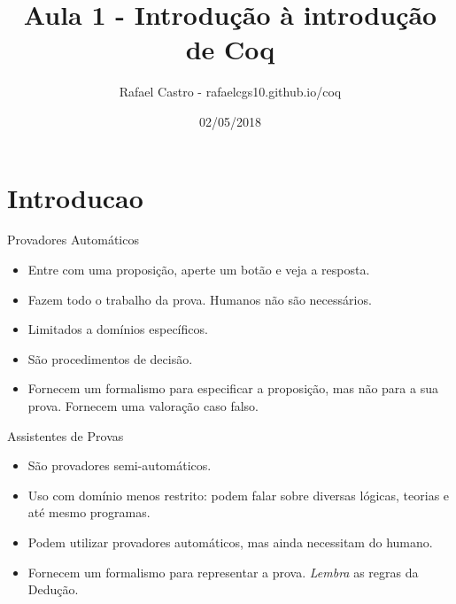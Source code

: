 \documentclass[presentation]{beamer}
\author{Rafael Castro - rafaelcgs10.github.io/coq}
\date{02/05/2018}
\title{Aula 1 - Introdução à introdução de Coq}
\begin{document}
\maketitle

\section{Introducao}
\label{sec:orgdc1ecc2}

\begin{frame}[label={sec:orgd47ef28}]{Provadores Automáticos}
\begin{itemize}
\item Entre com uma proposição, aperte um botão e veja a resposta.
\item Fazem todo o trabalho da prova. Humanos não são necessários.
\item Limitados a domínios específicos.
\item São procedimentos de decisão.
\item Fornecem um formalismo para especificar a proposição, mas não para a sua prova. Fornecem uma valoração caso falso.
\end{itemize}
\end{frame}
\begin{frame}[label={sec:orgb7485dd}]{Assistentes de Provas}
\begin{itemize}
\item São provadores semi-automáticos.
\item Uso com domínio menos restrito: podem falar sobre diversas lógicas, teorias e até mesmo programas.
\item Podem utilizar provadores automáticos, mas ainda necessitam do humano.
\item Fornecem um formalismo para representar a prova. \emph{Lembra} as regras da Dedução.
\end{itemize}
\end{frame}
\end{document}

